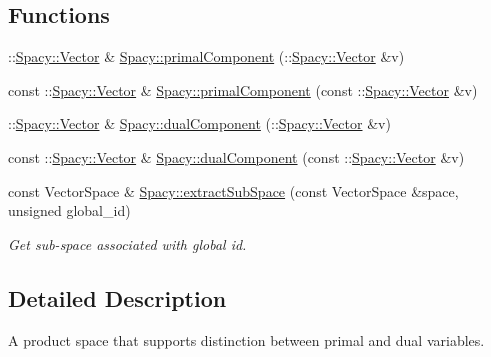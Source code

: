 \subsection*{Functions}
\begin{DoxyCompactItemize}
\item 
\-::\hyperlink{classSpacy_1_1Vector}{Spacy\-::\-Vector} \& \hyperlink{group__ProductSpaceGroup_gaa040ba5c24284687e0df19c99dd688a6}{Spacy\-::primal\-Component} (\-::\hyperlink{classSpacy_1_1Vector}{Spacy\-::\-Vector} \&v)
\item 
const \-::\hyperlink{classSpacy_1_1Vector}{Spacy\-::\-Vector} \& \hyperlink{group__ProductSpaceGroup_ga88c5bcc74072f75c63ab7d9448f80a7e}{Spacy\-::primal\-Component} (const \-::\hyperlink{classSpacy_1_1Vector}{Spacy\-::\-Vector} \&v)
\item 
\-::\hyperlink{classSpacy_1_1Vector}{Spacy\-::\-Vector} \& \hyperlink{group__ProductSpaceGroup_gafe51c084e3b03205db94e91309e834f7}{Spacy\-::dual\-Component} (\-::\hyperlink{classSpacy_1_1Vector}{Spacy\-::\-Vector} \&v)
\item 
const \-::\hyperlink{classSpacy_1_1Vector}{Spacy\-::\-Vector} \& \hyperlink{group__ProductSpaceGroup_gabe5978657aab46b1575e2521b336407d}{Spacy\-::dual\-Component} (const \-::\hyperlink{classSpacy_1_1Vector}{Spacy\-::\-Vector} \&v)
\item 
\hypertarget{group__ProductSpaceGroup_ga6054e5c78652ac4959f5d521acadd86a}{const Vector\-Space \& \hyperlink{group__ProductSpaceGroup_ga6054e5c78652ac4959f5d521acadd86a}{Spacy\-::extract\-Sub\-Space} (const Vector\-Space \&space, unsigned global\-\_\-id)}\label{group__ProductSpaceGroup_ga6054e5c78652ac4959f5d521acadd86a}

\begin{DoxyCompactList}\small\item\em Get sub-\/space associated with global id. \end{DoxyCompactList}\end{DoxyCompactItemize}


\subsection{Detailed Description}
A product space that supports distinction between primal and dual variables. 

